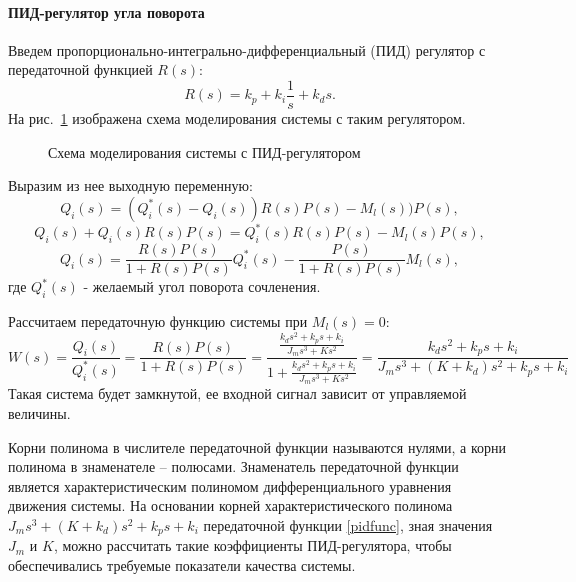 \paragraph*{ПИД-регулятор угла поворота\\}
\hspace*{\parindent}Введем пропорционально-интегрально-дифференциальный (ПИД) регулятор с передаточной функцией $R(s)$:
\begin{equation}
	R(s)=k_p+k_i\frac{1}{s}+k_ds.
\end{equation}
На рис.~\ref{pid} изображена схема моделирования системы с таким регулятором.

\begin{figure}[h]
	\noindent{}
	\caption{Схема моделирования системы с ПИД-регулятором}
	\label{pid}
\end{figure}

\hspace*{\parindent}Выразим из нее выходную переменную:
\begin{equation}
	Q_i(s)=(Q_i^*(s)-Q_i(s))R(s)P(s)-M_l(s))P(s),
\end{equation}
\begin{equation}
	Q_i(s)+Q_i(s)R(s)P(s)=Q_i^*(s)R(s)P(s)-M_l(s)P(s),
\end{equation}
\begin{equation}
	Q_i(s)=\frac{R(s)P(s)}{1+R(s)P(s)}Q_i^*(s)-\frac{P(s)}{1+R(s)P(s)}M_l(s),
\end{equation}
где $Q_i^*(s)$ - желаемый угол поворота сочленения.

Рассчитаем передаточную функцию системы при $M_l(s)=0$:
\begin{equation}\label{pidfunc}
	W(s)=\frac{Q_i(s)}{Q_i^*(s)}=\frac{R(s)P(s)}{1+R(s)P(s)}=\frac{\frac{k_ds^2+k_ps+k_i}{J_ms^3+Ks^2}}{1+\frac{k_ds^2+k_ps+k_i}{J_ms^3+Ks^2}}=\frac{k_ds^2+k_ps+k_i}{J_ms^3+(K+k_d)s^2+k_ps+k_i}
\end{equation}
Такая система будет замкнутой, ее входной сигнал зависит от управляемой величины.

Корни полинома в числителе передаточной функции называются нулями, а корни полинома в знаменателе – полюсами. Знаменатель передаточной функции является характеристическим полиномом дифференциального уравнения движения системы. На основании корней характеристического полинома $J_ms^3+(K+k_d)s^2+k_ps+k_i$ передаточной функции \eqref{pidfunc}, зная значения $J_m$ и $K$,  можно рассчитать такие коэффициенты ПИД-регулятора, чтобы обеспечивались требуемые показатели качества системы. 

